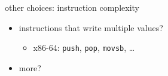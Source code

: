 
\begin{frame}[label=ISAChoicesComplexity,fragile]{other choices: instruction complexity}
    \begin{itemize}
        \item instructions that write multiple values?
        \begin{itemize}
            \item x86-64: \lstinline|push|, \lstinline|pop|, \lstinline|movsb|, \ldots{}
        \end{itemize}
        \item more?
    \end{itemize}
\end{frame}
